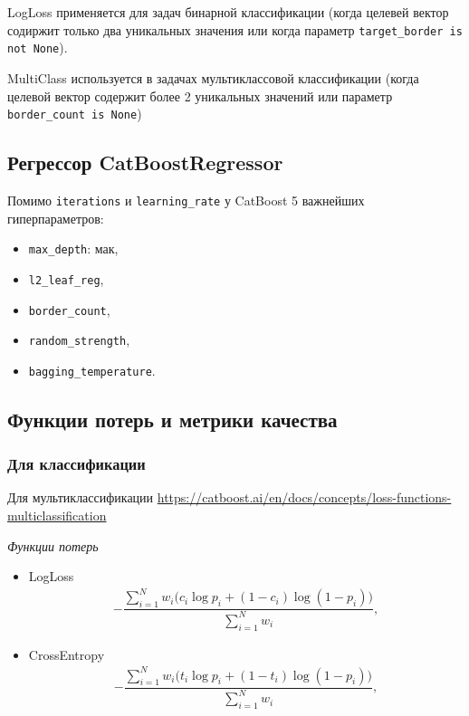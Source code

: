 \documentclass[%
	11pt,
	a4paper,
	utf8,
		]{article}
\begin{document}
LogLoss применяется для задач бинарной классификации (когда целевей вектор содиржит только два уникальных значения или когда параметр \verb|target_border is not None|).

MultiClass используется в задачах мультиклассовой классификации (когда целевой вектор содержит более 2 уникальных значений или параметр \verb|border_count is None|)

\subsection{Регрессор CatBoostRegressor}

Помимо \texttt{iterations} и \texttt{learning\_rate} у CatBoost 5 важнейших гиперпараметров:
\begin{itemize}
	\item \texttt{max\_depth}: мак,
	
	\item \texttt{l2\_leaf\_reg},
	
	\item \texttt{border\_count},
	
	\item \texttt{random\_strength},
	
	\item \texttt{bagging\_temperature}.
\end{itemize}

\subsection{Функции потерь и метрики качества}

\subsubsection{Для классификации}

Для мультиклассификации \url{https://catboost.ai/en/docs/concepts/loss-functions-multiclassification}

\emph{Функции потерь}
\begin{itemize}
	\item LogLoss
\begin{align*}
	- \dfrac{ \sum\limits_{i=1}^N w_i \big( c_i \log p_i + (1 - c_i) \log (1 - p_i) \big) }{ \sum\limits_{i=1}^{N} w_i },
\end{align*}

    \item CrossEntropy
\begin{align*}
	- \dfrac{ \sum\limits_{i=1}^N w_i \big( t_i \log p_i + (1 - t_i) \log (1 - p_i) \big) }{ \sum\limits_{i=1}^{N} w_i },
\end{align*}
\end{itemize}
\end{document}
